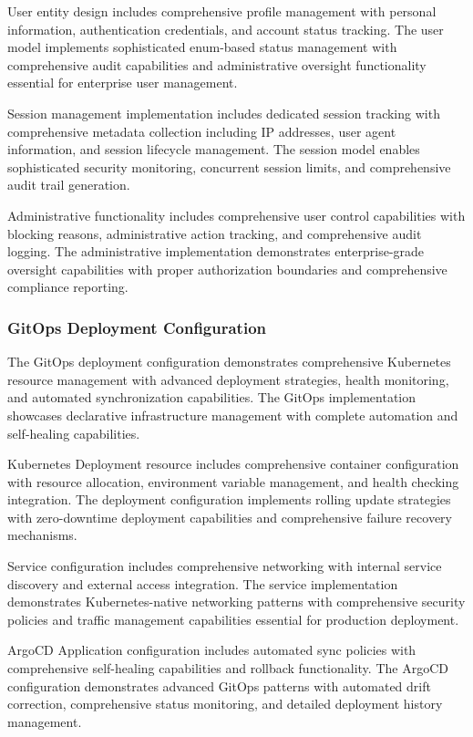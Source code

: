 User entity design includes comprehensive profile management with personal information, authentication credentials, and account status tracking. The user model implements sophisticated enum-based status management with comprehensive audit capabilities and administrative oversight functionality essential for enterprise user management.

Session management implementation includes dedicated session tracking with comprehensive metadata collection including IP addresses, user agent information, and session lifecycle management. The session model enables sophisticated security monitoring, concurrent session limits, and comprehensive audit trail generation.

Administrative functionality includes comprehensive user control capabilities with blocking reasons, administrative action tracking, and comprehensive audit logging. The administrative implementation demonstrates enterprise-grade oversight capabilities with proper authorization boundaries and comprehensive compliance reporting.

\subsubsection{GitOps Deployment Configuration}

The GitOps deployment configuration demonstrates comprehensive Kubernetes resource management with advanced deployment strategies, health monitoring, and automated synchronization capabilities. The GitOps implementation showcases declarative infrastructure management with complete automation and self-healing capabilities.

Kubernetes Deployment resource includes comprehensive container configuration with resource allocation, environment variable management, and health checking integration. The deployment configuration implements rolling update strategies with zero-downtime deployment capabilities and comprehensive failure recovery mechanisms.

Service configuration includes comprehensive networking with internal service discovery and external access integration. The service implementation demonstrates Kubernetes-native networking patterns with comprehensive security policies and traffic management capabilities essential for production deployment.

ArgoCD Application configuration includes automated sync policies with comprehensive self-healing capabilities and rollback functionality. The ArgoCD configuration demonstrates advanced GitOps patterns with automated drift correction, comprehensive status monitoring, and detailed deployment history management.

